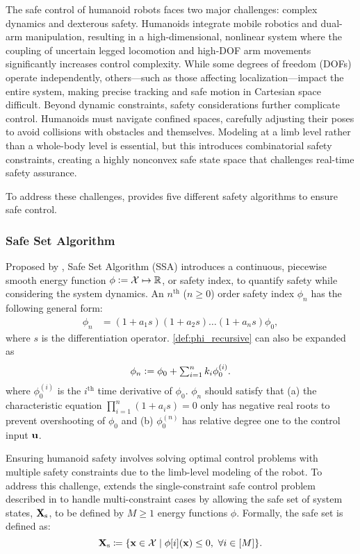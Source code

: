 The safe control of humanoid robots faces two major challenges: complex dynamics and dexterous safety. Humanoids integrate mobile robotics and dual-arm manipulation, resulting in a high-dimensional, nonlinear system where the coupling of uncertain legged locomotion and high-DOF arm movements significantly increases control complexity. While some degrees of freedom (DOFs) operate independently, others—such as those affecting localization—impact the entire system, making precise tracking and safe motion in Cartesian space difficult. Beyond dynamic constraints, safety considerations further complicate control. Humanoids must navigate confined spaces, carefully adjusting their poses to avoid collisions with obstacles and themselves. Modeling at a limb level rather than a whole-body level is essential, but this introduces combinatorial safety constraints, creating a highly nonconvex safe state space that challenges real-time safety assurance.


To address these challenges, \spark provides five different safety algorithms to ensure safe control.

\subsubsection{Safe Set Algorithm}
Proposed by \cite{liu2014control}, Safe Set Algorithm (SSA) introduces a continuous, piecewise smooth energy function $\phi \vcentcolon= \mathcal{X} \mapsto \mathbb{R}$, or safety index, to quantify safety while considering the system dynamics.
An $n^\mathrm{th}$ ($n\geq 0$) order safety index $\phi_n$ has the following general form:
\begin{equation}\label{def:phi_recursive}
    \begin{aligned}
        \phi_n &= (1+a_1 s)(1+a_2 s)\dots(1+a_n s)\phi_0,
    \end{aligned}
\end{equation}
where $s$ is the differentiation operator.
\eqref{def:phi_recursive} can also be expanded as
\begin{equation}\label{def:phi_root}
    \phi_n \vcentcolon= \phi_0 + \textstyle\sum_{i=1}^{n}k_i \phi^{(i)}_0.
\end{equation}
where $\phi_0^{(i)}$ is the $i^\mathrm{th}$ time derivative of $\phi_0$.
$\phi_n$ should satisfy that (a) the characteristic equation $\prod_{i=1}^n(1+a_i s) = 0$ only has negative real roots to prevent overshooting of $\phi_0$ and (b) $\phi_0^{(n)}$ has relative degree one to the control input $\mathbf{u}$.

Ensuring humanoid safety involves solving optimal control problems with multiple safety constraints due to the limb-level modeling of the robot. To address this challenge, \spark extends the single-constraint safe control problem described in \cite{liu2014control} to handle multi-constraint cases by allowing the safe set of system states, $\mathbf{X}_\mathrm{s}$, to be defined by $M \geq 1$ energy functions $\phi$.  
Formally, the safe set is defined as:  
\begin{equation}
    \mathbf{X}_\mathrm{s} \coloneqq \{\mathbf{x} \in \mathcal{X} \mid \phi[i](\mathbf{x}) \leq 0,~\forall i \in [M]\}.
\end{equation}  

